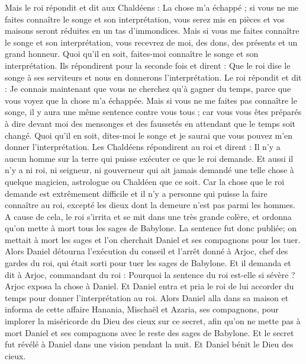 \begin{multicols}{2}
Mais le roi répondit et dit aux Chaldéens : La chose m'a échappé ; si vous ne me faites connaître le songe et son interprétation, vous serez mis en pièces et vos maisons seront réduites en un tas d'immondices.
Mais si vous me faites connaître le songe et son interprétation, vous recevrez de moi, des dons, des présents et un grand honneur. Quoi qu'il en soit, faites-moi connaître le songe et son interprétation.
Ils répondirent pour la seconde fois et dirent : Que le roi dise le songe à ses serviteurs et nous en donnerons l'interprétation.
Le roi répondit et dit : Je connais maintenant que vous ne cherchez qu'à gagner du temps, parce que vous voyez que la chose m'a échappée.
Mais si vous ne me faites pas connaître le songe, il y aura une même sentence contre vous tous ; car vous vous êtes préparés à dire devant moi des mensonges et des faussetés en attendant que le temps soit changé. Quoi qu'il en soit, dites-moi le songe et je saurai que vous pouvez m'en donner l'interprétation.
Les Chaldéens répondirent au roi et dirent : Il n'y a aucun homme sur la terre qui puisse exécuter ce que le roi demande. Et aussi il n'y a ni roi, ni seigneur, ni gouverneur qui ait jamais demandé une telle chose à quelque magicien, astrologue ou Chaldéen que ce soit.
Car la chose que le roi demande est extrêmement difficile et il n'y a personne qui puisse la faire connaître au roi, excepté les dieux dont la demeure n'est pas parmi les hommes.
A cause de cela, le roi s'irrita et se mit dans une très grande colère, et ordonna qu'on mette à mort tous les sages de Babylone.
La sentence fut donc publiée; on mettait à mort les sages et l'on cherchait Daniel et ses compagnons pour les tuer.
Alors Daniel détourna l'exécution du conseil et l'arrêt donné à Arjoc, chef des gardes du roi, qui était sorti pour tuer les sages de Babylone.
Et il demanda et dit à Arjoc, commandant du roi : Pourquoi la sentence du roi est-elle si sévère ? Arjoc exposa la chose à Daniel.
Et Daniel entra et pria le roi de lui accorder du temps pour donner l'interprétation au roi.
Alors Daniel alla dans sa maison et informa de cette affaire Hanania, Mischaël et Azaria, ses compagnons,
pour implorer la miséricorde du Dieu des cieux sur ce secret, afin qu'on ne mette pas à mort Daniel et ses compagnons avec le reste des sages de Babylone. 
Et le secret fut révélé à Daniel dans une vision pendant la nuit. Et Daniel bénit le Dieu des cieux.

\end{multicols}
